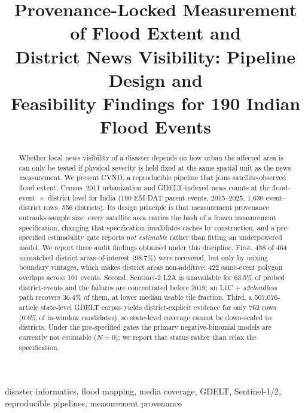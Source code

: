 \documentclass[conference]{IEEEtran}
\begin{document}
\title{Provenance-Locked Measurement of Flood Extent and\\
District News Visibility: Pipeline Design and\\
Feasibility Findings for 190 Indian Flood Events}

\author{
}

\maketitle

\begin{abstract}
Whether local news visibility of a disaster depends on how urban the affected
area is can only be tested if physical severity is held fixed at the same
spatial unit as the news measurement. We present CVND, a reproducible pipeline
that joins satellite-observed flood extent, Census~2011 urbanization and
GDELT-indexed news counts at the flood-event~$\times$~district level for India
(190 EM-DAT parent events, 2015--2025, 1{,}630 event--district rows, 556
districts). Its design principle is that measurement provenance outranks sample
size: every satellite area carries the hash of a frozen measurement
specification, changing that specification invalidates caches by construction,
and a pre-specified estimability gate reports \emph{not estimable} rather than
fitting an underpowered model. We report three audit findings obtained under
this discipline. First, 458 of 464 unmatched district areas-of-interest (98.7\%)
were recovered, but only by mixing boundary vintages, which makes district areas
non-additive: 422 same-event polygon overlaps across 101 events. Second,
Sentinel-2 L2A is unavailable for 63.5\% of probed district-events and the
failures are concentrated before 2019; an L1C + \textit{s2cloudless} path
recovers 36.4\% of them, at lower median usable tile fraction. Third, a
507{,}076-article state-level GDELT corpus yields district-explicit evidence for
only 762 rows (0.6\% of in-window candidates), so state-level coverage cannot be
down-scaled to districts. Under the pre-specified gates the primary
negative-binomial models are currently not estimable ($N=0$); we report that
status rather than relax the specification.
\end{abstract}

\begin{IEEEkeywords}
disaster informatics, flood mapping, media coverage, GDELT, Sentinel-1/2,
reproducible pipelines, measurement provenance
\end{IEEEkeywords}
\end{document}
